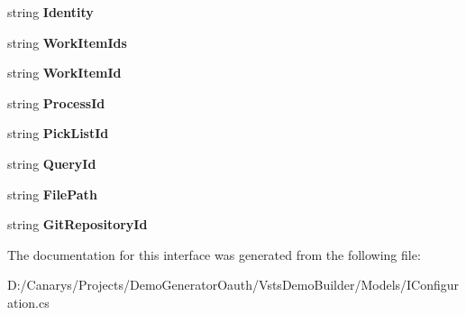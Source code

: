\begin{DoxyCompactItemize}
\mbox{\label{interface_vsts_demo_builder_1_1_models_1_1_i_configuration_ace8abf7dd9b043defbd2a54f0e0f3f22}} 
string {\bfseries Identity}
\item 
\mbox{\label{interface_vsts_demo_builder_1_1_models_1_1_i_configuration_a11d38bf8e1537bda5bc8f09a9cb9ed54}} 
string {\bfseries Work\+Item\+Ids}
\item 
\mbox{\label{interface_vsts_demo_builder_1_1_models_1_1_i_configuration_a15c943c58b8136080dac36039fd1fb4d}} 
string {\bfseries Work\+Item\+Id}
\item 
\mbox{\label{interface_vsts_demo_builder_1_1_models_1_1_i_configuration_a23acfb4a7652b43337df401da10e49a5}} 
string {\bfseries Process\+Id}
\item 
\mbox{\label{interface_vsts_demo_builder_1_1_models_1_1_i_configuration_ac5390f18f0b97ff00d0ea96d380da39a}} 
string {\bfseries Pick\+List\+Id}
\item 
\mbox{\label{interface_vsts_demo_builder_1_1_models_1_1_i_configuration_a129b27cd04dbbae4d176fa4ce97ef2b6}} 
string {\bfseries Query\+Id}
\item 
\mbox{\label{interface_vsts_demo_builder_1_1_models_1_1_i_configuration_aedb08f3de9e8cc57587feb6edea899fe}} 
string {\bfseries File\+Path}
\item 
\mbox{\label{interface_vsts_demo_builder_1_1_models_1_1_i_configuration_a7339cd106daaa6d93e722ffc0ebe8286}} 
string {\bfseries Git\+Repository\+Id}
\end{DoxyCompactItemize}


The documentation for this interface was generated from the following file\+:\begin{DoxyCompactItemize}
\item 
D\+:/\+Canarys/\+Projects/\+Demo\+Generator\+Oauth/\+Vsts\+Demo\+Builder/\+Models/I\+Configuration.\+cs\end{DoxyCompactItemize}
